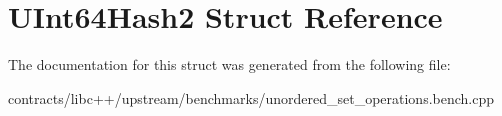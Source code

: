 \hypertarget{struct_u_int64_hash2}{}\section{U\+Int64\+Hash2 Struct Reference}
\label{struct_u_int64_hash2}


The documentation for this struct was generated from the following file\+:\begin{DoxyCompactItemize}
\item 
contracts/libc++/upstream/benchmarks/unordered\+\_\+set\+\_\+operations.\+bench.\+cpp\end{DoxyCompactItemize}
